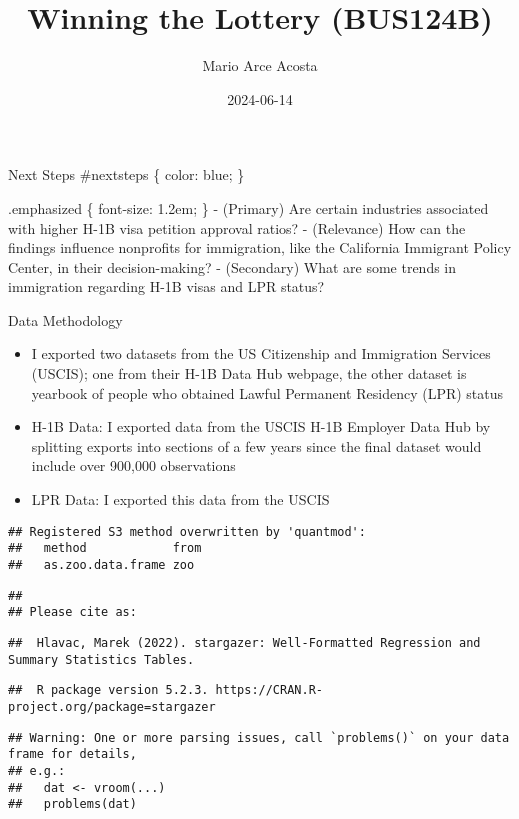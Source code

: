 \documentclass[
  ignorenonframetext,
]{beamer}
\title{Winning the Lottery (BUS124B)}
\author{Mario Arce Acosta}
\date{2024-06-14}
\providecommand{\tightlist}{%
  \setlength{\itemsep}{0pt}\setlength{\parskip}{0pt}}
\begin{document}
\frame{\titlepage}

\begin{frame}{Next Steps}
\label{nextsteps}
\#nextsteps \{ color: blue; \}

.emphasized \{ font-size: 1.2em; \} - (Primary) Are certain industries
associated with higher H-1B visa petition approval ratios? - (Relevance)
How can the findings influence nonprofits for immigration, like the
California Immigrant Policy Center, in their decision-making? -
(Secondary) What are some trends in immigration regarding H-1B visas and
LPR status?
\end{frame}

\begin{frame}[fragile]{Data Methodology}
\label{data-methodology}
\begin{itemize}
\tightlist
\item
  I exported two datasets from the US Citizenship and Immigration
  Services (USCIS); one from their H-1B Data Hub webpage, the other
  dataset is yearbook of people who obtained Lawful Permanent Residency
  (LPR) status
\item
  H-1B Data: I exported data from the USCIS H-1B Employer Data Hub by
  splitting exports into sections of a few years since the final dataset
  would include over 900,000 observations
\item
  LPR Data: I exported this data from the USCIS
\end{itemize}

\begin{verbatim}
## Registered S3 method overwritten by 'quantmod':
##   method            from
##   as.zoo.data.frame zoo
\end{verbatim}

\begin{verbatim}
## 
## Please cite as:
\end{verbatim}

\begin{verbatim}
##  Hlavac, Marek (2022). stargazer: Well-Formatted Regression and Summary Statistics Tables.
\end{verbatim}

\begin{verbatim}
##  R package version 5.2.3. https://CRAN.R-project.org/package=stargazer
\end{verbatim}

\begin{verbatim}
## Warning: One or more parsing issues, call `problems()` on your data frame for details,
## e.g.:
##   dat <- vroom(...)
##   problems(dat)
\end{verbatim}


\end{frame}
\end{document}
